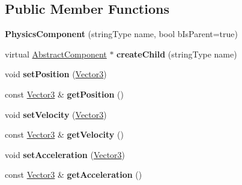 \subsection*{Public Member Functions}
\begin{DoxyCompactItemize}
\item 
\hypertarget{classPhysicsComponent_a2b81b290bbe4de88a1d1d6a7de952976}{{\bfseries Physics\-Component} (string\-Type name, bool b\-Is\-Parent=true)}\label{classPhysicsComponent_a2b81b290bbe4de88a1d1d6a7de952976}

\item 
\hypertarget{classPhysicsComponent_a476d9f79534f4eccb859565baa23959a}{virtual \hyperlink{classAbstractComponent}{Abstract\-Component} $\ast$ {\bfseries create\-Child} (string\-Type name)}\label{classPhysicsComponent_a476d9f79534f4eccb859565baa23959a}

\item 
\hypertarget{classPhysicsComponent_a1d18fb6d77aa08d109b20d4eaaf89345}{void {\bfseries set\-Position} (\hyperlink{classVector3}{Vector3})}\label{classPhysicsComponent_a1d18fb6d77aa08d109b20d4eaaf89345}

\item 
\hypertarget{classPhysicsComponent_a910cb9034a2f1388cb25f917277d908f}{const \hyperlink{classVector3}{Vector3} \& {\bfseries get\-Position} ()}\label{classPhysicsComponent_a910cb9034a2f1388cb25f917277d908f}

\item 
\hypertarget{classPhysicsComponent_a2f07fb094c66adc9fdea7284b5bcea87}{void {\bfseries set\-Velocity} (\hyperlink{classVector3}{Vector3})}\label{classPhysicsComponent_a2f07fb094c66adc9fdea7284b5bcea87}

\item 
\hypertarget{classPhysicsComponent_a1671a670abf64645e1d1d6b4004b07d3}{const \hyperlink{classVector3}{Vector3} \& {\bfseries get\-Velocity} ()}\label{classPhysicsComponent_a1671a670abf64645e1d1d6b4004b07d3}

\item 
\hypertarget{classPhysicsComponent_a1612b260d69cbb39c5b99e16a4494a19}{void {\bfseries set\-Acceleration} (\hyperlink{classVector3}{Vector3})}\label{classPhysicsComponent_a1612b260d69cbb39c5b99e16a4494a19}

\item 
\hypertarget{classPhysicsComponent_a1189857c1a6dd6ddf8f0418ab883a378}{const \hyperlink{classVector3}{Vector3} \& {\bfseries get\-Acceleration} ()}\label{classPhysicsComponent_a1189857c1a6dd6ddf8f0418ab883a378}


\end{DoxyCompactItemize}
